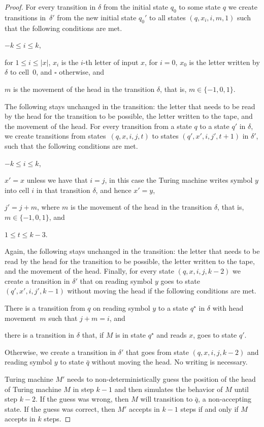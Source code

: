 \documentclass[11pt,a4,USenglish]{article}
\theoremstyle{definition}
\theoremstyle{plain}
\theoremstyle{remark}
\begin{document}
{\begin{proof}
  For every transition in $\delta$ from the initial state $q_0$ to some state $q$ we create transitions in~$\delta'$ from the new initial state $q_0'$ to all states $(q,x_i, i, m, 1)$ such that the following conditions are met.
  \begin{compactitem}
    \item $-k\leq i\leq k$,
    \item for $1\le i \le |x|$, $x_i$ is the $i$-th letter of input $x$, for $i=0$, $x_0$ is the letter written by $\delta$ to cell~$0$, and $\square$ otherwise, and
    \item $m$ is the movement of the head in the transition $\delta$, that is, $m\in\{-1, 0, 1\}$.
  \end{compactitem}
  The following stays unchanged in the transition: the letter that needs to be read by the head for the transition to be possible, the letter written to the tape, and the movement of the head.
  For every transition from a state $q$ to a state $q'$ in $\delta$, we create transitions from states~$(q, x, i, j, t)$ to states $(q', x', i, j', t+1)$ in $\delta'$, such that the following conditions are met.
  \begin{compactitem}
    \item $-k\leq i\leq k$,
    \item $x'=x$ unless we have that $i=j$, in this case the Turing machine writes symbol $y$ into cell $i$ in that transition $\delta$, and hence $x' = y$,
    \item $j' = j+m$, where $m$ is the movement of the head in the transition $\delta$, that is, $m\in\{-1, 0, 1\}$, and
    \item $1\le t \le k-3$.
  \end{compactitem}
  Again, the following stays unchanged in the transition: the letter that needs to be read by the head for the transition to be possible, the letter written to the tape, and the movement of the head. Finally, for every state $(q, x, i, j, k-2)$ we create a transition in $\delta'$ that on reading symbol $y$ goes to state $(q', x', i, j', k-1)$ without moving the head if the following conditions are met.
  \begin{compactitem}
    \item There is a transition from $q$ on reading symbol $y$ to a state $q^\star$ in $\delta$ with head movement~$m$ such that $j+m=i$, and
    \item there is a transition in $\delta$ that, if $M$ is in state $q^\star$ and reads $x$, goes to state $q'$. 
  \end{compactitem}
  Otherwise, we create a transition in $\delta'$ that goes from state $(q, x, i, j, k-2)$ and reading symbol $y$ to state $\bar{q}$ without moving the head. No writing is necessary.


  Turing machine $M'$ needs to non-deterministically guess the position of the head of Turing machine $M$ in step $k-1$ and then simulates the behavior of $M$ until step $k-2$. If the guess was wrong, then $M$ will transition to $\bar{q}$, a non-accepting state. If the guess was correct, then $M'$ accepts in $k-1$ steps if and only if $M$ accepts in $k$ steps. 
  \end{proof}
}
\end{document}
